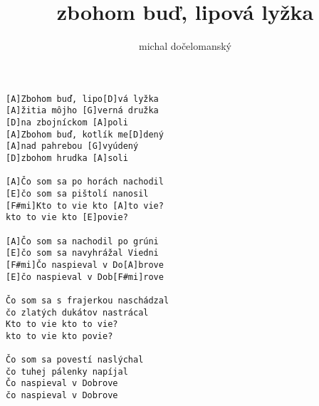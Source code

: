 \author{michal dočelomanský}
\title{zbohom buď, lipová lyžka}
\maketitle
\begin{verbatim}
[A]Zbohom buď, lipo[D]vá lyžka
[A]žitia môjho [G]verná družka
[D]na zbojníckom [A]poli
[A]Zbohom buď, kotlík me[D]dený
[A]nad pahrebou [G]vyúdený
[D]zbohom hrudka [A]soli

[A]Čo som sa po horách nachodil
[E]čo som sa pištolí nanosil
[F#mi]Kto to vie kto [A]to vie?
kto to vie kto [E]povie?

[A]Čo som sa nachodil po grúni
[E]čo som sa navyhrážal Viedni
[F#mi]Čo naspieval v Do[A]brove
[E]čo naspieval v Dob[F#mi]rove

Čo som sa s frajerkou naschádzal
čo zlatých dukátov nastrácal
Kto to vie kto to vie?
kto to vie kto povie?

Čo som sa povestí naslýchal
čo tuhej pálenky napíjal
Čo naspieval v Dobrove
čo naspieval v Dobrove
\end{verbatim}